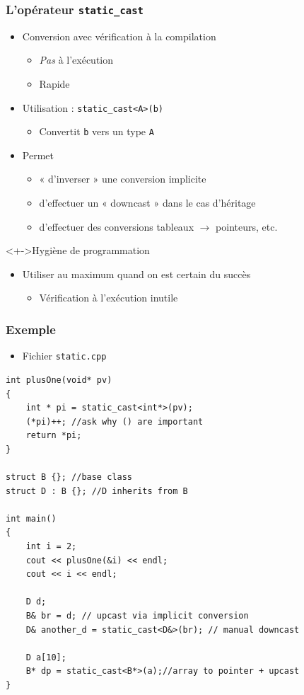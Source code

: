 \begin{frame}
\frametitle{L'opérateur \texttt{static\_cast}}
\begin{itemize}[<+->]
\item Conversion avec vérification à la compilation
	\begin{itemize}
	\item \emph{Pas} à l'exécution
	\item Rapide
	\end{itemize}
\item Utilisation : \lstinline|static_cast<A>(b)|
	\begin{itemize}
	\item Convertit \texttt{b} vers un type \texttt{A}
	\end{itemize}
\item Permet
	\begin{itemize}
	\item « d'inverser » une conversion implicite
	\item d'effectuer un « downcast » dans le cas d'héritage
	\item d'effectuer des conversions tableaux $\rightarrow$ pointeurs, etc.
	\end{itemize}
\end{itemize}
\begin{block}<+->{Hygiène de programmation}
	\begin{itemize}[<+->]
	\item Utiliser au maximum quand on est certain du succès
		\begin{itemize}
		\item Vérification à l'exécution inutile
		\end{itemize}
	\end{itemize}
\end{block}
\end{frame}

\begin{frame}[containsverbatim]
\frametitle{Exemple}
\begin{itemize}
\item Fichier \texttt{static.cpp}
\end{itemize}
\begin{lstlisting}
int plusOne(void* pv)
{
	int * pi = static_cast<int*>(pv);
	(*pi)++; //ask why () are important
	return *pi;
}

struct B {}; //base class
struct D : B {}; //D inherits from B

int main()
{
	int i = 2;
	cout << plusOne(&i) << endl;
	cout << i << endl;

	D d;
	B& br = d; // upcast via implicit conversion
	D& another_d = static_cast<D&>(br); // manual downcast

	D a[10];
	B* dp = static_cast<B*>(a);//array to pointer + upcast
}
\end{lstlisting}
\end{frame}

